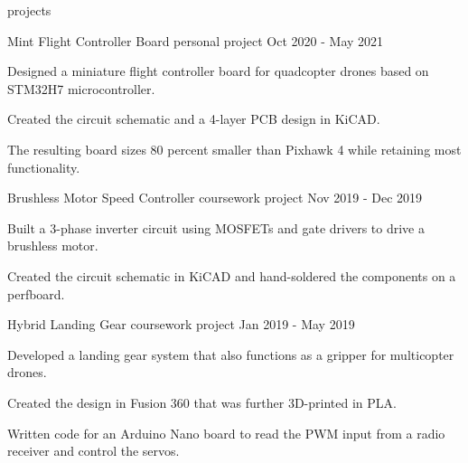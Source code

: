 \begin{section}{projects}

  \begin{project}
    {Mint Flight Controller Board}
    {personal project}
    {Oct 2020 - May 2021}

    \item Designed a miniature flight controller board for quadcopter drones
          based on STM32H7 microcontroller.

    \item Created the circuit schematic and a 4-layer PCB design in KiCAD.

    \item The resulting board sizes 80 percent smaller than Pixhawk 4 while
          retaining most functionality.

  \end{project}

  \begin{project}
    {Brushless Motor Speed Controller}
    {coursework project}
    {Nov 2019 - Dec 2019}

    \item Built a 3-phase inverter circuit using MOSFETs and gate drivers to
          drive a brushless motor.

    \item Created the circuit schematic in KiCAD and hand-soldered the
          components on a perfboard.

  \end{project}

  \begin{project}
    {Hybrid Landing Gear}
    {coursework project}
    {Jan 2019 - May 2019}

    \item Developed a landing gear system that also functions as a gripper for
          multicopter drones.

    \item Created the design in Fusion 360 that was further 3D-printed in PLA.

    \item Written code for an Arduino Nano board to read the PWM input from a
          radio receiver and control the servos.

  \end{project}

\end{section}

